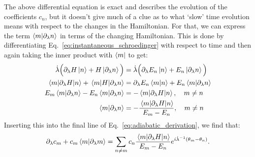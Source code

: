     The above differential equation is exact and describes the evolution of the coefficients $c_n$,  but it doesn't give much of a clue as to what `slow' time evolution means with respect to the changes in the Hamiltonian. For that, we can express the term $\braket{m}{\partial_{\lambda} n}$ in terms of the changing Hamiltonian. This is done by differentiating Eq.~\eqref{eq:instantaneous_schroedinger} with respect to time and then again taking the inner product with $\bra{m}$ to get:
    \begin{equation}\label{eq:hamiltonian_derivative}
        \begin{aligned}
            \dot{\lambda} \Big(\partial_{\lambda}{H}\ket{n} + H \ket{\partial_{\lambda} n}\Big)  &= \dot{\lambda} \Big(\partial_{\lambda}{E_n}\ket{n} + E_n \ket{\partial_{\lambda} n}\Big) \\
            \mel{m}{\partial_{\lambda}H}{n} + \mel{m}{H}{\partial_{\lambda}n} &= \partial_{\lambda} E_n\braket{m}{n} + E_n \braket{m}{\partial_{\lambda} n} \\
            E_m \braket{m}{\partial_{\lambda} n} - E_n \braket{m}{\partial_{\lambda} n} &= - \mel{m}{\partial_{\lambda}H}{n}, \quad m \neq n \\
            \braket{m}{\partial_{\lambda} n} &= - \frac{\mel{m}{\partial_{\lambda}H}{n}}{E_m - E_n}, \quad m \neq n
        \end{aligned}
    \end{equation}
    Inserting this into the final line of Eq.~\eqref{eq:adiabatic_derivation}, we find that:
    \begin{equation}\label{eq:coefficient_exact}
            \partial_{\lambda} c_m + c_m \braket{m}{\partial_{\lambda} m} = \sum_{n \neq m} c_n  \frac{\mel{m}{\partial_{\lambda}H}{n}}{E_m - E_n}e^{i \dot{\lambda}^{-1} (\theta_m-\theta_n)}.
    \end{equation}
    
